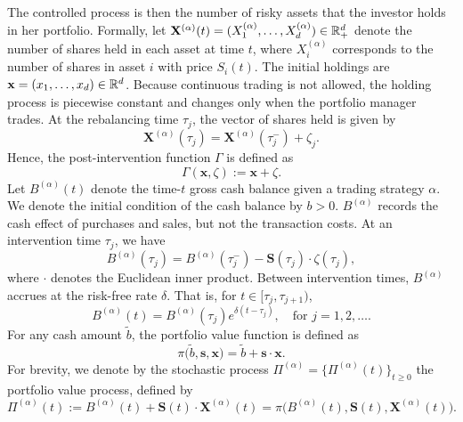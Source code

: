 The controlled process is then the number of risky assets that the investor holds in her portfolio. Formally, let $\mathbf{X}^{(\alpha)}(t)=(X_1^{(\alpha)}, \ldots, X_d^{(\alpha)}) \in \mathbb{R}_+^d$ denote the number of shares held in each asset at time $t$, where $X^{(\alpha)}_i$ corresponds to the number of shares in asset $i$ with price $S_i(t)$. The initial holdings are $\mathbf x = (x_1, \ldots, x_d) \in \mathbb{R}^d$. Because continuous trading is not allowed, the holding process is piecewise constant and changes only when the portfolio manager trades. At the rebalancing time $\tau_j$, the vector of shares held is given by
\begin{equation*}
    \mathbf{X}^{(\alpha)}(\tau_j) = \mathbf{X}^{(\alpha)}(\tau_j^-) + \zeta_j. 
\end{equation*}
Hence, the post-intervention function $\Gamma$ is defined as
\begin{equation*}
    \Gamma(\mathbf{x},\zeta) := \mathbf{x} + \zeta. 
\end{equation*}
Let $B^{(\alpha)}(t)$ denote the time-$t$ gross cash balance given a trading strategy $\alpha$. We denote the initial condition of the cash balance by $b>0$. $B^{(\alpha)}$ records the cash effect of purchases and sales, but not the transaction costs. At an intervention time $\tau_j$, we have
\begin{equation*}
    B^{(\alpha)}(\tau_j) = B^{(\alpha)}(\tau_j^-) - \mathbf{S}(\tau_j) \cdot \zeta(\tau_j),
\end{equation*}
where $\cdot$ denotes the Euclidean inner product. Between intervention times, $B^{(\alpha)}$ accrues at the risk-free rate $\delta$. That is, for $t \in [\tau_j, \tau_{j+1})$,
\begin{equation*}
    B^{(\alpha)}(t) = B^{(\alpha)}(\tau_j) e^{\delta(t-\tau_j)}, \quad \text{for } j = 1, 2, \ldots. 
\end{equation*}
For any cash amount $\tilde b$, the portfolio value function is defined as
\begin{equation}
    \pi \big(\tilde b, \mathbf{s}, \mathbf{x}\big) = \tilde b + \mathbf{s} \cdot \mathbf{x}. 
    \label{eqn: portfolio function}
\end{equation}
For brevity, we denote by the stochastic process $\Pi^{(\alpha)}=\{\Pi^{(\alpha)}(t)\}_{t \geq 0}$ the portfolio value process, defined by
\begin{equation}
    \Pi^{(\alpha)}(t) := B^{(\alpha)}(t) + \mathbf S(t) \cdot \mathbf X^{(\alpha)}(t) = \pi \big(B^{(\alpha)}(t), \mathbf S(t), \mathbf X^{(\alpha)}(t)\big). 
    \label{eqn: portfolio process}
\end{equation}
